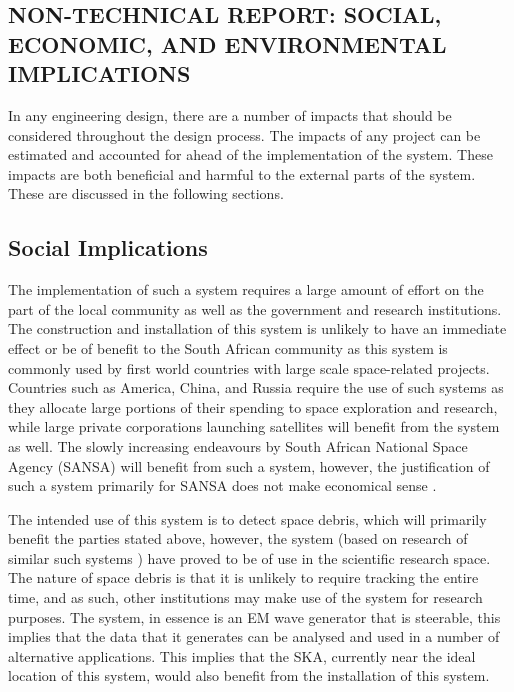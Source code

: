 \documentclass[11pt]{witseiepaper}
\begin{document}
\newpage
\onecolumn
{}
\setcounter{page}{1}
\setcounter{figure}{0} 
\renewcommand{\thefigure}
{A\arabic{figure}}

\onecolumn
\begin{bibunit}[witseie]
\appendix



\section{NON-TECHNICAL REPORT: SOCIAL, ECONOMIC, AND ENVIRONMENTAL IMPLICATIONS} \label{sec:SOCIALECONOMICANDENVIRONMENTALIMPLICATIONS}
In any engineering design, there are a number of impacts that should be considered throughout the design process. The impacts of any project can be estimated and accounted for ahead of the implementation of the system. These impacts are both beneficial and harmful to the external parts of the system. These are discussed in the following sections.

\subsection{Social Implications} \label{sec:SocialImplications}

The implementation of such a system requires a large amount of effort on the part of the local community as well as the government and research institutions.
The construction and installation of this system is unlikely to have an immediate effect or be of benefit to the South African community as this system is commonly used by first world countries with large scale space-related projects. Countries such as America, China, and Russia require the use of such systems as they allocate large portions of their spending to space exploration and research, while large private corporations launching satellites will benefit from the system as well. The slowly increasing endeavours by South African National Space Agency (SANSA) will benefit from such a system, however, the justification of such a system primarily for SANSA does not make economical sense \cite{SANSA}.

The intended use of this system is to detect space debris, which will primarily benefit the parties stated above, however, the system (based on research of similar such systems \cite{AMISR,EISCAT}) have proved to be of use in the scientific research space.
The nature of space debris is that it is unlikely to require tracking the entire time, and as such, other institutions may make use of the system for research purposes. The system, in essence is an EM wave generator that is steerable, this implies that the data that it generates can be analysed and used in a number of alternative applications.
This implies that the SKA, currently near the ideal location of this system, would also benefit from the installation of this system.



\end{bibunit}
\end{document}

